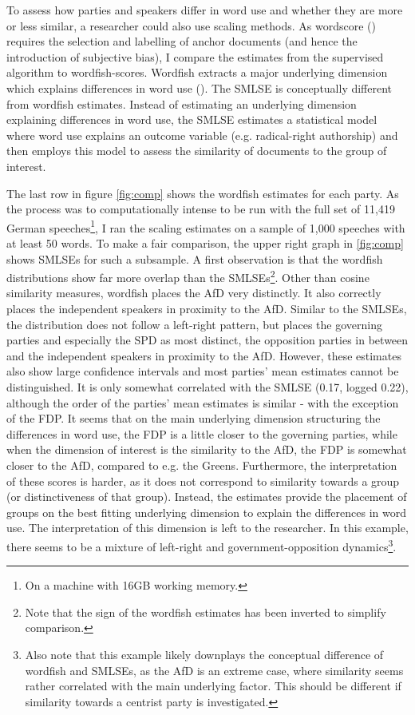 \documentclass{article}
\begin{document}
To assess how parties and speakers differ in word use and whether they are more or less similar, a researcher could also use scaling methods. As wordscore (\cite{Laver2003}) requires the selection and labelling of anchor documents (and hence the introduction of subjective bias), I compare the estimates from the supervised algorithm to wordfish-scores. Wordfish extracts a major underlying dimension which explains differences in word use (\cite{Slapin2008}). The SMLSE is conceptually different from wordfish estimates. Instead of estimating an underlying dimension explaining differences in word use, the SMLSE estimates a statistical model where word use explains an outcome variable (e.g. radical-right authorship) and then employs this model to assess the similarity of documents to the group of interest. \par

The last row in figure \ref{fig:comp} shows the wordfish estimates for each party. As the process was to computationally intense to be run with the full set of 11,419 German speeches\footnote{On a machine with 16GB working memory.}, I ran the scaling estimates on a sample of 1,000 speeches with at least 50 words. To make a fair comparison, the upper right graph in \ref{fig:comp} shows SMLSEs for such a subsample. A first observation is that the wordfish distributions show far more overlap than the SMLSEs\footnote{Note that the sign of the wordfish estimates has been inverted to simplify comparison.}. Other than cosine similarity measures, wordfish places the AfD very distinctly. It also correctly places the independent speakers in proximity to the AfD. Similar to the SMLSEs, the distribution does not follow a left-right pattern, but places the governing parties and especially the SPD as most distinct, the opposition parties in between and the independent speakers in proximity to the AfD. However, these estimates also show large confidence intervals and most parties' mean estimates cannot be distinguished. It is only somewhat correlated with the SMLSE (0.17, logged 0.22), although the order of the parties' mean estimates is similar - with the exception of the FDP. It seems that on the main underlying dimension structuring the differences in word use, the FDP is a little closer to the governing parties, while when the dimension of interest is the similarity to the AfD, the FDP is somewhat closer to the AfD, compared to e.g. the Greens. Furthermore, the interpretation of these scores is harder, as it does not correspond to similarity towards a group (or distinctiveness of that group). Instead, the estimates provide the placement of groups on the best fitting underlying dimension to explain the differences in word use. The interpretation of this dimension is left to the researcher. In this example, there seems to be a mixture of left-right and government-opposition dynamics\footnote{Also note that this example likely downplays the conceptual difference of wordfish and SMLSEs, as the AfD is an extreme case, where similarity seems rather correlated with the main underlying factor. This should be different if similarity towards a centrist party is investigated.}.\par
\end{document}
